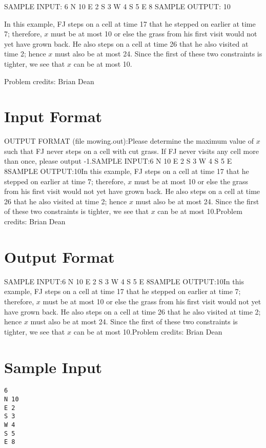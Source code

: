 \documentclass[12pt]{article}
\begin{document}
SAMPLE INPUT:
6
N 10
E 2
S 3
W 4
S 5
E 8
SAMPLE OUTPUT: 
10

In this example, FJ steps on a cell at time 17 that he stepped on earlier at
time 7; therefore, $x$ must be at most 10 or else the grass from his first visit
would not yet have grown back.  He also steps on a cell at time 26 that he also
visited at time 2; hence $x$ must also be at most 24.  Since the first of these
two constraints is tighter, we see that $x$ can be at most 10.

Problem credits: Brian Dean



\section*{Input Format}
OUTPUT FORMAT (file mowing.out):Please determine the maximum value of $x$ such that FJ never steps on a cell
with cut grass.  If FJ never visits any cell more than once, please
output -1.SAMPLE INPUT:6
N 10
E 2
S 3
W 4
S 5
E 8SAMPLE OUTPUT:10In this example, FJ steps on a cell at time 17 that he stepped on earlier at
time 7; therefore, $x$ must be at most 10 or else the grass from his first visit
would not yet have grown back.  He also steps on a cell at time 26 that he also
visited at time 2; hence $x$ must also be at most 24.  Since the first of these
two constraints is tighter, we see that $x$ can be at most 10.Problem credits: Brian Dean

\section*{Output Format}
SAMPLE INPUT:6
N 10
E 2
S 3
W 4
S 5
E 8SAMPLE OUTPUT:10In this example, FJ steps on a cell at time 17 that he stepped on earlier at
time 7; therefore, $x$ must be at most 10 or else the grass from his first visit
would not yet have grown back.  He also steps on a cell at time 26 that he also
visited at time 2; hence $x$ must also be at most 24.  Since the first of these
two constraints is tighter, we see that $x$ can be at most 10.Problem credits: Brian Dean

\section*{Sample Input}
\begin{verbatim}
6
N 10
E 2
S 3
W 4
S 5
E 8
\end{verbatim}
\end{document}
